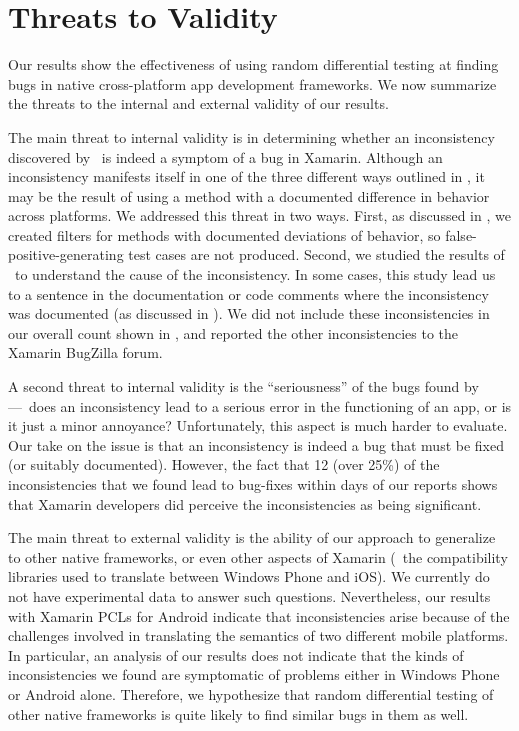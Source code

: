 \section{Threats to Validity}
\label{section:threats}

Our results show the effectiveness of using random differential testing at
finding bugs in native cross-platform app development frameworks. We now
summarize the threats to the internal and external validity of our results.

The main threat to internal validity is in determining whether an inconsistency
discovered by \tool\ is indeed a symptom of a bug in Xamarin. Although an
inconsistency manifests itself in one of the three different ways outlined in
, it may be the result of using a method
with a documented difference in behavior across platforms. We addressed this
threat in two ways. First, as discussed in , we created
filters for methods with documented deviations of behavior, so
false-positive-generating test cases are not produced. Second, we studied the
results of \tool\ to understand the cause of the inconsistency. In some cases,
this study lead us to a sentence in the documentation or code comments where
the inconsistency was documented (as discussed in
). We did not include these inconsistencies in our
overall count shown in , and reported the other
inconsistencies to the Xamarin BugZilla forum.

A second threat to internal validity is the ``seriousness'' of the bugs found
by \tool---\ie~does an inconsistency lead to a serious error in the functioning
of an app, or is it just a minor annoyance? Unfortunately, this aspect is much
harder to evaluate. Our take on the issue is that an inconsistency is indeed a
bug that must be fixed (or suitably documented). However, the fact that 12
(over 25\%) of the inconsistencies that we found lead to bug-fixes within days
of our reports shows that Xamarin developers did perceive the inconsistencies
as being significant.

The main threat to external validity is the ability of our approach to
generalize to other native frameworks, or even other aspects of Xamarin
(\eg~the compatibility libraries used to translate between Windows Phone and
iOS). We currently do not have experimental data to answer such questions.
Nevertheless, our results with Xamarin PCLs for Android indicate that
inconsistencies arise because of the challenges involved in translating the
semantics of two different mobile platforms. In particular, an analysis of our
results does not indicate that the kinds of inconsistencies we found are
symptomatic of problems either in Windows Phone or Android alone. Therefore, we
hypothesize that random differential testing of other native frameworks is
quite likely to find similar bugs in them as well.

